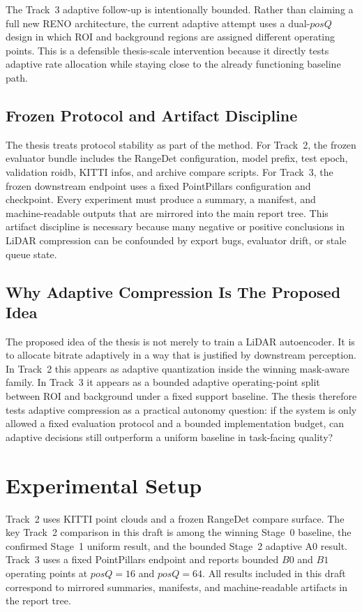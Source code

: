 The Track~3 adaptive follow-up is intentionally bounded. Rather than claiming a full new RENO architecture, the current adaptive attempt uses a dual-\(posQ\) design in which ROI and background regions are assigned different operating points. This is a defensible thesis-scale intervention because it directly tests adaptive rate allocation while staying close to the already functioning baseline path.

\subsection{Frozen Protocol and Artifact Discipline}
The thesis treats protocol stability as part of the method. For Track~2, the frozen evaluator bundle includes the RangeDet configuration, model prefix, test epoch, validation roidb, KITTI infos, and archive compare scripts. For Track~3, the frozen downstream endpoint uses a fixed PointPillars configuration and checkpoint. Every experiment must produce a summary, a manifest, and machine-readable outputs that are mirrored into the main report tree. This artifact discipline is necessary because many negative or positive conclusions in LiDAR compression can be confounded by export bugs, evaluator drift, or stale queue state.

\subsection{Why Adaptive Compression Is The Proposed Idea}
The proposed idea of the thesis is not merely to train a LiDAR autoencoder. It is to allocate bitrate adaptively in a way that is justified by downstream perception. In Track~2 this appears as adaptive quantization inside the winning mask-aware family. In Track~3 it appears as a bounded adaptive operating-point split between ROI and background under a fixed support baseline. The thesis therefore tests adaptive compression as a practical autonomy question: if the system is only allowed a fixed evaluation protocol and a bounded implementation budget, can adaptive decisions still outperform a uniform baseline in task-facing quality?

\section{Experimental Setup}\label{sec:setup}
Track~2 uses KITTI point clouds and a frozen RangeDet compare surface. The key Track~2 comparison in this draft is among the winning Stage~0 baseline, the confirmed Stage~1 uniform result, and the bounded Stage~2 adaptive A0 result. Track~3 uses a fixed PointPillars endpoint and reports bounded \(B0\) and \(B1\) operating points at \(posQ=16\) and \(posQ=64\). All results included in this draft correspond to mirrored summaries, manifests, and machine-readable artifacts in the report tree.

